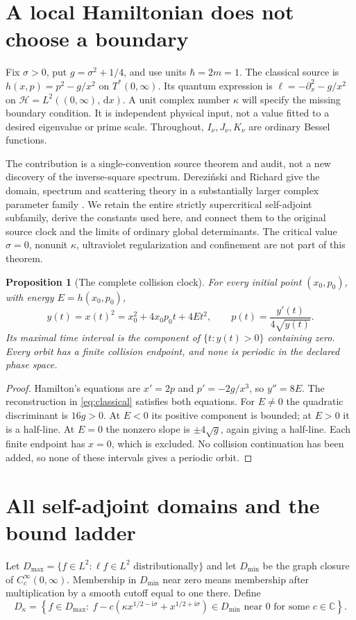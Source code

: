 \documentclass[10pt]{article}
\newcommand{\ii}{\mathrm i}
\newcommand{\dd}{\,\mathrm d}
\newcommand{\C}{\mathbb C}
\newtheorem{proposition}{Proposition}
\begin{document}
\section{A local Hamiltonian does not choose a boundary}
Fix $\sigma>0$, put $g=\sigma^2+1/4$, and use units $\hbar=2m=1$.
The classical source is $h(x,p)=p^2-g/x^2$ on $T^*(0,\infty)$.
Its quantum expression is $\ell=-\partial_x^2-g/x^2$ on
$\mathcal H=L^2((0,\infty),\dd x)$. A unit complex number $\kappa$ will
specify the missing boundary condition. It is independent physical input,
not a value fitted to a desired eigenvalue or prime scale.
Throughout, $I_\nu,J_\nu,K_\nu$ are ordinary Bessel functions.

The contribution is a single-convention source theorem and audit, not a new
discovery of the inverse-square spectrum. Dereziński and Richard give the
domain, spectrum and scattering theory in a substantially larger complex
parameter family \cite{dr2017}. We retain the entire strictly supercritical
self-adjoint subfamily, derive the constants used here, and connect them to
the original source clock and the limits of ordinary global determinants.
The critical value $\sigma=0$, nonunit $\kappa$, ultraviolet regularization
and confinement are not part of this theorem.

\begin{proposition}[The complete collision clock]
For every initial point $(x_0,p_0)$, with energy $E=h(x_0,p_0)$,
\begin{equation}
 y(t)=x(t)^2=x_0^2+4x_0p_0t+4Et^2,\qquad
 p(t)=\frac{y'(t)}{4\sqrt{y(t)}}.
 \label{eq:classical}
\end{equation}
Its maximal time interval is the component of $\{t:y(t)>0\}$ containing zero.
Every orbit has a finite collision endpoint, and none is periodic in the
declared phase space.
\end{proposition}
\begin{proof}
Hamilton's equations are $x'=2p$ and $p'=-2g/x^3$, so $y''=8E$.
The reconstruction in \eqref{eq:classical} satisfies both equations.
For $E\ne0$ the quadratic discriminant is $16g>0$.
At $E<0$ its positive component is bounded; at $E>0$ it is a half-line.
At $E=0$ the nonzero slope is $\pm4\sqrt g$, again giving a half-line.
Each finite endpoint has $x=0$, which is excluded. No collision continuation
has been added, so none of these intervals gives a periodic orbit.
\end{proof}

\section{All self-adjoint domains and the bound ladder}
Let $D_{\max}=\{f\in L^2:\ell f\in L^2\text{ distributionally}\}$ and
let $D_{\min}$ be the graph closure of $C_c^\infty(0,\infty)$.
Membership in $D_{\min}$ near zero means membership after multiplication
by a smooth cutoff equal to one there. Define
\begin{equation}
 D_\kappa=\left\{f\in D_{\max}:\ %
 f-c(\kappa x^{1/2-\ii\sigma}+x^{1/2+\ii\sigma})
 \in D_{\min}\text{ near }0\text{ for some }c\in\C\right\}.
 \label{eq:domain}
\end{equation}
\end{document}
